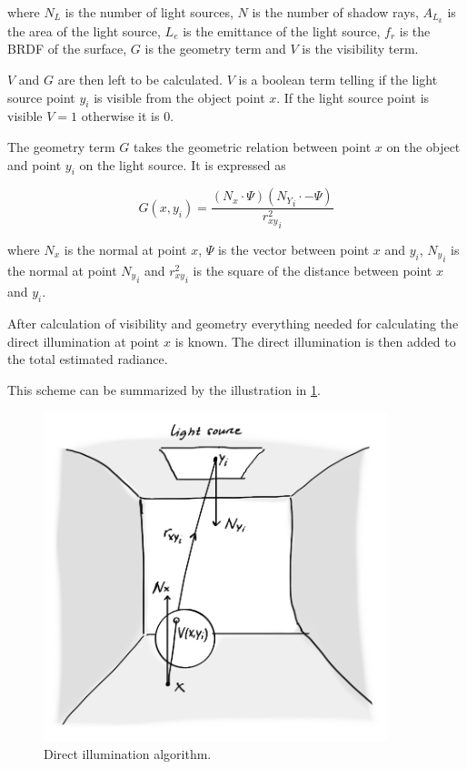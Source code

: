 \documentclass[a4paper]{report}
\begin{document}
where \(N_L\) is the number of light sources, \(N\) is the number of
shadow rays, \(A_{L_k}\) is the area
of the light source, \(L_e\) is the emittance of the light source,
\(f_r\) is the BRDF of the surface, \(G\) is the geometry term and \(V\) is the
visibility term.

\(V\) and \(G\) are then left to be calculated. \(V\) is a boolean
term telling if the light source point \(y_i\) is visible from the
object point \(x\). If the light source point is visible \(V = 1\)
otherwise it is \(0\).

The geometry term \(G\) takes the geometric relation between point
\(x\) on the object and point \(y_i\) on the light source. It is
expressed as

\begin{equation}
  G(x,y_i) = \frac{(N_x \cdot \Psi)({N_Y}_i \cdot -\Psi)}{{r^2_{xy}}_i}
  \label{eq:geometry}
\end{equation}

where \(N_x\) is the normal at point \(x\), \(\Psi\) is the vector
between point \(x\) and \(y_i\), \({N_y}_i\) is the normal at point
\({N_y}_i\) and \({r^2_{xy}}_i\) is the square of the distance between
point \(x\) and \(y_i\).

After calculation of visibility and geometry everything needed for
calculating the direct illumination at point \(x\) is known. The
direct illumination is then added to the total estimated radiance.

This scheme can be summarized by the illustration in \ref{fig:direct}.

\begin{figure}
  \centering
  \includegraphics[width=10cm]{figures/4}
  \caption{Direct illumination algorithm.}
  \label{fig:direct}
\end{figure}
\end{document}
